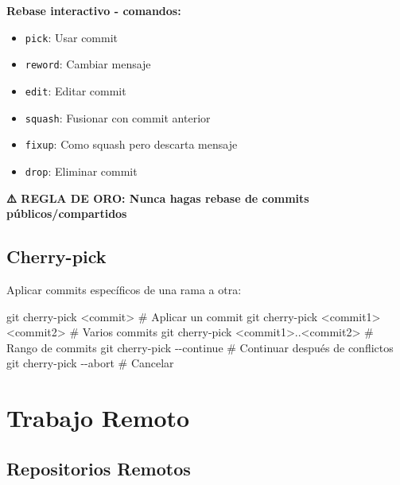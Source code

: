\documentclass[
  doc,
  floatsintext,
  longtable,
  a4paper,
  nolmodern,
  notxfonts,
  notimes,
  12pt,
  colorlinks=true,linkcolor=blue,citecolor=blue,urlcolor=blue]{apa7}
\newenvironment{Shaded}{\begin{snugshade}}{\end{snugshade}}
\newcommand{\AttributeTok}[1]{\textcolor[rgb]{0.40,0.45,0.13}{#1}}
\newcommand{\CommentTok}[1]{\textcolor[rgb]{0.37,0.37,0.37}{#1}}
\newcommand{\FunctionTok}[1]{\textcolor[rgb]{0.28,0.35,0.67}{#1}}
\newcommand{\NormalTok}[1]{\textcolor[rgb]{0.00,0.23,0.31}{#1}}
\newcommand{\OperatorTok}[1]{\textcolor[rgb]{0.37,0.37,0.37}{#1}}
\providecommand{\tightlist}{%
  \setlength{\itemsep}{0pt}\setlength{\parskip}{0pt}}
\begin{document}
\textbf{Rebase interactivo - comandos:}

\begin{itemize}
\tightlist
\item
  \texttt{pick}: Usar commit
\item
  \texttt{reword}: Cambiar mensaje
\item
  \texttt{edit}: Editar commit
\item
  \texttt{squash}: Fusionar con commit anterior
\item
  \texttt{fixup}: Como squash pero descarta mensaje
\item
  \texttt{drop}: Eliminar commit
\end{itemize}

\textbf{⚠️ REGLA DE ORO: Nunca hagas rebase de commits
públicos/compartidos}

\subsection{Cherry-pick}\label{cherry-pick}

Aplicar commits específicos de una rama a otra:

\begin{Shaded}
\begin{Highlighting}[]
\FunctionTok{git}\NormalTok{ cherry{-}pick }\OperatorTok{\textless{}}\NormalTok{commit}\OperatorTok{\textgreater{}}   \CommentTok{\# Aplicar un commit}
\FunctionTok{git}\NormalTok{ cherry{-}pick }\OperatorTok{\textless{}}\NormalTok{commit1}\OperatorTok{\textgreater{}} \OperatorTok{\textless{}}\NormalTok{commit2}\OperatorTok{\textgreater{}}   \CommentTok{\# Varios commits}
\FunctionTok{git}\NormalTok{ cherry{-}pick }\OperatorTok{\textless{}}\NormalTok{commit1}\OperatorTok{\textgreater{}}\NormalTok{..}\OperatorTok{\textless{}}\NormalTok{commit2}\OperatorTok{\textgreater{}}  \CommentTok{\# Rango de commits}
\FunctionTok{git}\NormalTok{ cherry{-}pick }\AttributeTok{{-}{-}continue} \CommentTok{\# Continuar después de conflictos}
\FunctionTok{git}\NormalTok{ cherry{-}pick }\AttributeTok{{-}{-}abort}    \CommentTok{\# Cancelar}
\end{Highlighting}
\end{Shaded}

\section{Trabajo Remoto}\label{trabajo-remoto}

\subsection{Repositorios Remotos}\label{repositorios-remotos}
\end{document}
